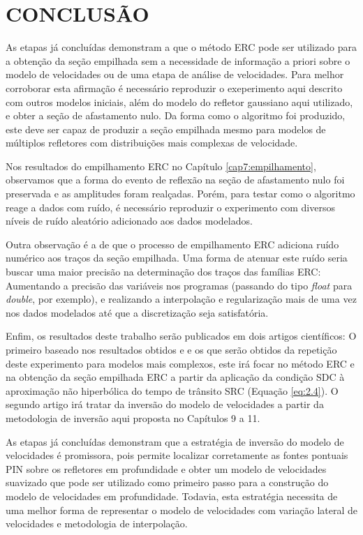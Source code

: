 \chapter{CONCLUSÃO}
\label{cap10:conclusao}

As etapas já concluídas demonstram a que o método ERC pode ser utilizado para a obtenção da seção empilhada sem a necessidade
de informação a priori sobre o modelo de velocidades ou de uma etapa de análise de velocidades. Para melhor corroborar esta 
afirmação é necessário reproduzir o exeperimento aqui descrito com outros modelos iniciais, além do modelo do refletor gaussiano
aqui utilizado, e obter a seção de afastamento nulo.
Da forma como o algoritmo foi produzido, este deve ser capaz de produzir a seção empilhada mesmo para modelos de múltiplos refletores
com distribuições mais complexas de velocidade.

Nos resultados do empilhamento ERC no Capítulo \ref{cap7:empilhamento}, observamos que a forma do evento de reflexão na seção
de afastamento nulo foi preservada e as amplitudes foram realçadas. Porém, para testar como o algoritmo reage
a dados com ruído, é necessário reproduzir o experimento com diversos níveis de ruído aleatório adicionado aos dados modelados.

Outra observação é a de que o processo de empilhamento ERC adiciona ruído numérico aos traços da seção empilhada. Uma forma de
atenuar este ruído seria buscar uma maior precisão na determinação dos traços das famílias ERC: Aumentando a precisão das variáveis
nos programas (passando do tipo \textit{float} para \textit{double}, por exemplo), e realizando a interpolação e regularização
mais de uma vez nos dados modelados até que a discretização seja satisfatória.

Enfim, os resultados deste trabalho serão publicados em dois artigos científicos: O primeiro baseado 
nos resultados obtidos e e os que 
serão obtidos da repetição deste experimento para modelos mais complexos, este irá focar no método ERC e na obtenção da seção
empilhada ERC a partir da aplicação da condição SDC à aproximação não hiperbólica do tempo de trânsito SRC (Equação \ref{eq:2.4}).
O segundo artigo irá tratar da inversão do modelo de velocidades a partir da metodologia de inversão aqui proposta
no Capítulos 9 a 11.

As etapas já concluídas demonstram que a estratégia de inversão do modelo de velocidades é promissora,
pois permite localizar corretamente as fontes pontuais PIN sobre os refletores em profundidade
e obter um modelo de velocidades suavizado que pode ser utilizado como primeiro passo
para a construção do modelo de velocidades em profundidade. Todavia,
esta estratégia necessita de uma melhor forma de representar o modelo de velocidades com variação lateral
de velocidades e metodologia de interpolação.

